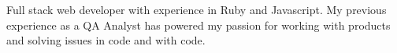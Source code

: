 \vspace{-1.0mm}

\begin{cvparagraph}

Full stack web developer with experience in Ruby and Javascript. My previous experience as a QA Analyst has powered my passion for working with products and solving issues in code and with code.\end{cvparagraph}
